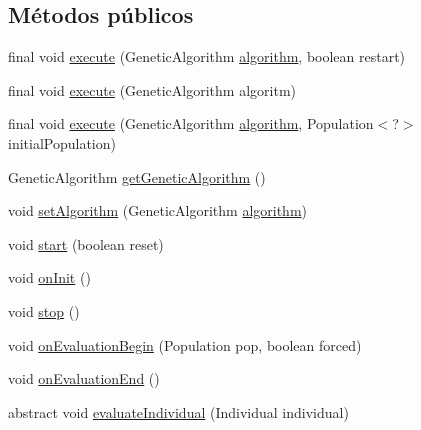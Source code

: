 \subsection*{Métodos públicos}
\begin{DoxyCompactItemize}
\item 
final void \hyperlink{classjenes_1_1utils_1_1multitasking_1_1_runner_a24d074cbd5140cd8bc65623fa1961f39}{execute} (Genetic\-Algorithm \hyperlink{classjenes_1_1utils_1_1multitasking_1_1_runner_a699ccf526b6116f97abc09e4ce390c89}{algorithm}, boolean restart)
\item 
final void \hyperlink{classjenes_1_1utils_1_1multitasking_1_1_runner_ae222d69f44508fc432c05074272e0ae3}{execute} (Genetic\-Algorithm algoritm)
\item 
final void \hyperlink{classjenes_1_1utils_1_1multitasking_1_1_runner_a7205f2d93d68f40e3e87dccf92cc3720}{execute} (Genetic\-Algorithm \hyperlink{classjenes_1_1utils_1_1multitasking_1_1_runner_a699ccf526b6116f97abc09e4ce390c89}{algorithm}, Population$<$?$>$ initial\-Population)
\item 
Genetic\-Algorithm \hyperlink{classjenes_1_1utils_1_1multitasking_1_1_runner_a462a121a840bbf06593bbd7da219d8b9}{get\-Genetic\-Algorithm} ()
\item 
void \hyperlink{classjenes_1_1utils_1_1multitasking_1_1_runner_adad9fb400d736e55bcd3dfdf07742437}{set\-Algorithm} (Genetic\-Algorithm \hyperlink{classjenes_1_1utils_1_1multitasking_1_1_runner_a699ccf526b6116f97abc09e4ce390c89}{algorithm})
\item 
void \hyperlink{classjenes_1_1utils_1_1multitasking_1_1_runner_a5dc1ed49495150ff26ec5194010b00e4}{start} (boolean reset)
\item 
void \hyperlink{classjenes_1_1utils_1_1multitasking_1_1_runner_a4c4d4a0cd7aec110d60da5c660903398}{on\-Init} ()
\item 
void \hyperlink{classjenes_1_1utils_1_1multitasking_1_1_runner_ac89e8ac54daba2e326e687662ff9f7b0}{stop} ()
\item 
void \hyperlink{classjenes_1_1utils_1_1multitasking_1_1_runner_a6ec13cf0fb2ff03461a3a397421505cf}{on\-Evaluation\-Begin} (Population pop, boolean forced)
\item 
void \hyperlink{classjenes_1_1utils_1_1multitasking_1_1_runner_a82c84ad942296d62849248b107ec3a2c}{on\-Evaluation\-End} ()
\item 
abstract void \hyperlink{classjenes_1_1utils_1_1multitasking_1_1_runner_a250c5e0ffdb86ef0bb0e78e625a449e7}{evaluate\-Individual} (Individual individual)
\end{DoxyCompactItemize}
